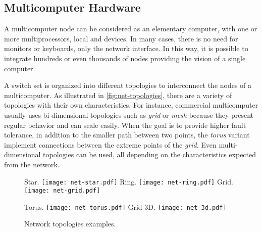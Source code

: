 		\subsection{Multicomputer Hardware}
		\label{sec.multicomputers-hw}

			A multicomputer node can be considered as an elementary computer, with one or
			more multiprocessors, local \ram and \io devices.
			In many cases, there is no need for monitors or keyboards, only the
			network interface.
			In this way, it is possible to integrate hundreds or even thousands
			of nodes providing the vision of a single computer.

			A switch set is organized into different topologies to interconnect
			the nodes of a multicomputer.
			As illustrated in \autoref{fig:net-topologies}, there are a
			variety of topologies with their own characteristics.
			For instance, commercial multicomputer usually uses bi-dimensional
			topologies such as \textit{grid} or \textit{mesh} because they present
			regular behavior and can scale easily.
			When the goal is to provide higher fault tolerance, in addition to the
			smaller path between two points, the \textit{torus} variant implement
			connections between the extreme points of the \textit{grid}.
			Even multi-dimensional topologies can be used, all depending on the
			characteristics expected from the network.

			\begin{figure}[!tb]
				\centering%
				\caption{Network topologies examples.}%
				\label{fig:net-topologies}%

					{Star.}%
					{\texttt{[image: net-star.pdf]}}%
				\hspace{1cm}%
					{Ring.}%
					{\texttt{[image: net-ring.pdf]}}%
				\hspace{1cm}%
					{Grid.}%
					{\texttt{[image: net-grid.pdf]}}%

				\vspace{0.5cm}%

					{Torus.}%
					{\texttt{[image: net-torus.pdf]}}%
				\hspace{1cm}%
					{Grid 3D.}%
					{\texttt{[image: net-3d.pdf]}}%

			\end{figure}

